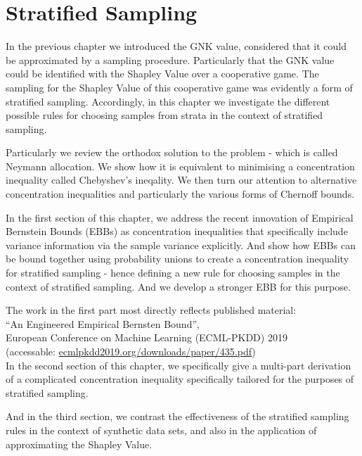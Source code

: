 \chapter{Stratified Sampling}

In the previous chapter we introduced the GNK value, considered that it could be approximated by a sampling procedure.
Particularly that the GNK value could be identified with the Shapley Value over a cooperative game.
The sampling for the Shapley Value of this cooperative game was evidently a form of stratified sampling.
Accordingly, in this chapter we investigate the different possible rules for choosing samples from strata in the context of stratified sampling.

Particularly we review the orthodox solution to the problem - which is called Neymann allocation.
We show how it is equivalent to minimising a concentration inequality called Chebyshev's ineqality.
We then turn our attention to alternative concentration inequalities and particularly the various forms of Chernoff bounds.

In the first section of this chapter, we address the recent innovation of Empirical Bernstein Bounds (EBBs) as concentration inequalities that specifically include variance information via the sample variance explicitly.
And show how EBBs can be bound together using probability unions to create a concentration inequality for stratified sampling - hence defining a new rule for choosing samples in the context of stratified sampling.
And we develop a stronger EBB for this purpose.

The work in the first part most directly reflects published material: \\\-\hspace{1cm}``An Engineered Empirical Bernsten Bound'',\\ European Conference on Machine Learning (ECML-PKDD) 2019\\(accessable: \href{http://ecmlpkdd2019.org/downloads/paper/435.pdf}{ecmlpkdd2019.org/downloads/paper/435.pdf})\\

In the second section of this chapter, we specifically give a multi-part derivation of a complicated concentration inequality specifically tailored for the purposes of stratified sampling.

And in the third section, we contrast the effectiveness of the stratified sampling rules in the context of synthetic data sets, and also in the application of approximating the Shapley Value.


